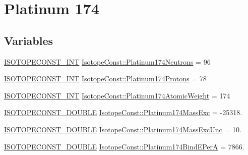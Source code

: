 \hypertarget{group___isotope_const-_platinum-_pt174}{}\section{Platinum 174}
\label{group___isotope_const-_platinum-_pt174}
\subsection*{Variables}
\begin{DoxyCompactItemize}
\item 
\mbox{\hyperlink{group___isotope_const-_macros_ga5f18360b3e99483a35c32d789e62621c}{I\+S\+O\+T\+O\+P\+E\+C\+O\+N\+S\+T\+\_\+\+I\+NT}} \mbox{\hyperlink{group___isotope_const-_platinum-_pt174_ga6ee1eb9509ff26ba51592937050163eb}{Isotope\+Const\+::\+Platinum174\+Neutrons}} = 96
\item 
\mbox{\hyperlink{group___isotope_const-_macros_ga5f18360b3e99483a35c32d789e62621c}{I\+S\+O\+T\+O\+P\+E\+C\+O\+N\+S\+T\+\_\+\+I\+NT}} \mbox{\hyperlink{group___isotope_const-_platinum-_pt174_ga0a95c76f1898a9667c7c7b8c04d782c2}{Isotope\+Const\+::\+Platinum174\+Protons}} = 78
\item 
\mbox{\hyperlink{group___isotope_const-_macros_ga5f18360b3e99483a35c32d789e62621c}{I\+S\+O\+T\+O\+P\+E\+C\+O\+N\+S\+T\+\_\+\+I\+NT}} \mbox{\hyperlink{group___isotope_const-_platinum-_pt174_ga53249b014628aa2be6cd3d1a92e4932b}{Isotope\+Const\+::\+Platinum174\+Atomic\+Weight}} = 174
\item 
\mbox{\hyperlink{group___isotope_const-_macros_ga8f45a7272ce02c0b4c65c44636ed719a}{I\+S\+O\+T\+O\+P\+E\+C\+O\+N\+S\+T\+\_\+\+D\+O\+U\+B\+LE}} \mbox{\hyperlink{group___isotope_const-_platinum-_pt174_ga6baebf6bf135a24c399e4cbd1ec31391}{Isotope\+Const\+::\+Platinum174\+Mass\+Exc}} = -\/25318.
\item 
\mbox{\hyperlink{group___isotope_const-_macros_ga8f45a7272ce02c0b4c65c44636ed719a}{I\+S\+O\+T\+O\+P\+E\+C\+O\+N\+S\+T\+\_\+\+D\+O\+U\+B\+LE}} \mbox{\hyperlink{group___isotope_const-_platinum-_pt174_ga18cf0af536da8a714366b30a30e7a4d6}{Isotope\+Const\+::\+Platinum174\+Mass\+Exc\+Unc}} = 10.
\item 
\mbox{\hyperlink{group___isotope_const-_macros_ga8f45a7272ce02c0b4c65c44636ed719a}{I\+S\+O\+T\+O\+P\+E\+C\+O\+N\+S\+T\+\_\+\+D\+O\+U\+B\+LE}} \mbox{\hyperlink{group___isotope_const-_platinum-_pt174_ga2a93735d459543e10c71edc276f618f2}{Isotope\+Const\+::\+Platinum174\+Bind\+E\+PerA}} = 7866.
\item 

\end{DoxyCompactItemize}
